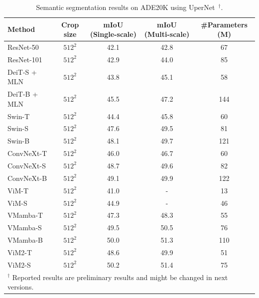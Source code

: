 \documentclass{article}
\begin{document}
\begin{table}[t]
\centering
\caption{Semantic segmentation results on ADE20K using UperNet~\citep{upernet}$^\dagger$.
}
\resizebox{.90\linewidth}{!}
{
\begin{tabular}{lcccc}
\toprule
Method & Crop size & mIoU (Single-scale) & mIoU (Multi-scale) & \#Parameters (M)  \\
\midrule
ResNet-50~\citep{He2016resnet} & $512^{2}$ & 42.1 & 42.8 & 67   \\
ResNet-101~\citep{He2016resnet} & $512^{2}$ & 42.9 & 44.0 & 85  \\
\midrule
DeiT-S + MLN~\citep{touvron2021training} & $512^{2}$ & 43.8 & 45.1 & 58  \\
DeiT-B + MLN~\citep{touvron2021training} & $512^{2}$ & 45.5 & 47.2 & 144 \\
\midrule
Swin-T~\citep{liu2021swin} & $512^{2}$ & 44.4 & 45.8 & 60  \\
Swin-S~\citep{liu2021swin} & $512^{2}$ & 47.6 & 49.5 & 81 \\
Swin-B~\citep{liu2021swin} & $512^{2}$ & 48.1 & 49.7 & 121 \\
\midrule
ConvNeXt-T~\citep{liu2022convnet}& $512^{2}$ & 46.0 & 46.7 & 60  \\
ConvNeXt-S~\citep{liu2022convnet} & $512^{2}$ & 48.7 & 49.6 & 82 \\
ConvNeXt-B~\citep{liu2022convnet} & $512^{2}$ & 49.1 & 49.9 & 122 \\
\midrule
ViM-T~\citep{zhu2024ViM} & $512^{2}$ & 41.0 & - & 13  \\
ViM-S~\citep{zhu2024ViM} & $512^{2}$ & 44.9 & - & 46 \\
\midrule
VMamba-T~\citep{liu2024vmamba} & $512^{2}$ & 47.3 & 48.3 & 55  \\
VMamba-S~\citep{liu2024vmamba} & $512^{2}$ & 49.5 & 50.5 & 76  \\
VMamba-B~\citep{liu2024vmamba} & $512^{2}$ & 50.0 & 51.3 & 110  \\
\midrule
\rowcolor{myblue}
ViM2-T & $512^{2}$ & 48.6 & 49.9 & 51  \\
\rowcolor{myblue}
ViM2-S & $512^{2}$ & 50.2 & 51.4 & 75  \\
\bottomrule
\multicolumn{5}{l}{$^\dagger$ Reported results are preliminary results and might be changed in next versions.}
\end{tabular}
}
\label{tab:ade20k}

\end{table}
\end{document}
